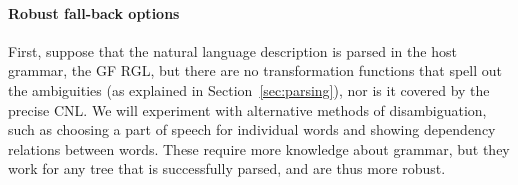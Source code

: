 \documentclass[11pt]{article}
\begin{document}


\paragraph{Robust fall-back options}
\label{sec:graceful_degradation}
First, suppose that the natural language description is parsed in the host grammar, the GF RGL, 
but there are no transformation functions that spell out the ambiguities (as explained in Section~\ref{sec:parsing}),
nor is it covered by the precise CNL.
We will experiment with alternative methods of disambiguation, such as choosing a part of speech for individual words and showing dependency relations between words.
These require more knowledge about grammar, but they work for any tree that is successfully parsed, and are thus more robust.

    
 
\end{document}
